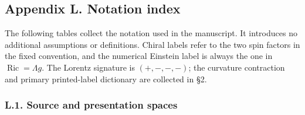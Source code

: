 \documentclass[
  english,
  11pt,
  reqno]{amsart}
\begin{document}
\clearpage
\protect{}\label{app:gg-notation}

\protect{}\label{sec:gg-notation-index}

\subsection{Appendix L. Notation
index}\label{appendix-l.-notation-index}

The following tables collect the notation used in the manuscript. It
introduces no additional assumptions or definitions. Chiral labels refer
to the two spin factors in the fixed convention, and the numerical
Einstein label is always the one in \(\operatorname{Ric}=\Lambda g\).
The Lorentz signature is \((+,-,-,-)\); the curvature contraction and
primary printed-label dictionary are collected in §2.

\protect{}\label{sec:gg-notation-source}

\subsubsection{L.1. Source and presentation
spaces}\label{l.1.-source-and-presentation-spaces}
\end{document}
